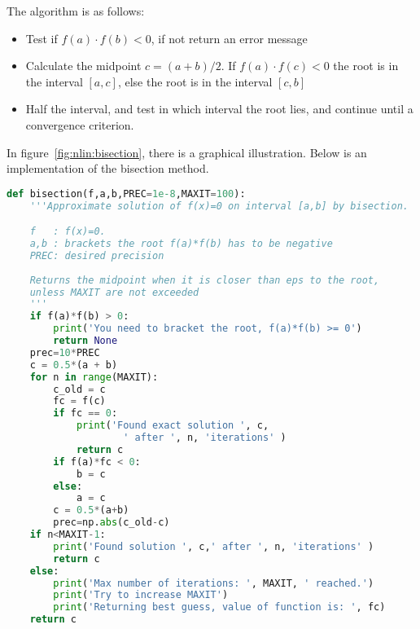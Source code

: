 \documentclass[graybox,sectrefs,envcountresetchap,open=right,final]{svmonodo}
\begin{document}
The algorithm is as follows:
\begin{itemize}
\item Test if $f(a)\cdot f(b)<0$, if not return an error message

\item Calculate the midpoint $c=(a+b)/2$. If $f(a)\cdot f(c)<0$ the root is in the interval $[a,c]$, else the root is in the interval $[c,b]$

\item Half the interval, and test in which interval the root lies, and continue until a convergence criterion.
\end{itemize}

\noindent
In figure~\ref{fig:nlin:bisection}, there is a graphical illustration.
Below is an implementation of the bisection method.





































\begin{lstlisting}[language=python,style=blue1]
def bisection(f,a,b,PREC=1e-8,MAXIT=100):
    '''Approximate solution of f(x)=0 on interval [a,b] by bisection.

    f   : f(x)=0.
    a,b : brackets the root f(a)*f(b) has to be negative 
    PREC: desired precision
    
    Returns the midpoint when it is closer than eps to the root, 
    unless MAXIT are not exceeded
    '''
    if f(a)*f(b) > 0:
        print('You need to bracket the root, f(a)*f(b) >= 0')
        return None
    prec=10*PREC
    c = 0.5*(a + b)
    for n in range(MAXIT):
        c_old = c 
        fc = f(c)
        if fc == 0:
            print('Found exact solution ', c, 
                    ' after ', n, 'iterations' )
            return c
        if f(a)*fc < 0:
            b = c
        else:
            a = c
        c = 0.5*(a+b)
        prec=np.abs(c_old-c)
    if n<MAXIT-1:
        print('Found solution ', c,' after ', n, 'iterations' )
        return c
    else:
        print('Max number of iterations: ', MAXIT, ' reached.') 
        print('Try to increase MAXIT')
        print('Returning best guess, value of function is: ', fc)
    return c

\end{lstlisting}
\end{document}
